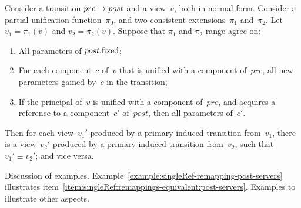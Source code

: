 \begin{lemma}
\label{lem:singleRef:remappings-equivalent}
Consider a transition $pre \stackrel{}\rightarrow post$ and a view~$v$, both in normal form.
Consider a partial unification function~$\pi_0$, and two consistent
extensions~$\pi_1$ and~$\pi_2$.  Let $v_1 = \pi_1(v)$ and $v_2 = \pi_2(v)$.
Suppose that $\pi_1$ and $\pi_2$ range-agree on:
%
\begin{enumerate}
\item\label{item:singleRef:remappings-equivalent:post-servers} All parameters
  of $post.\mathrm{fixed}$;

\item For each component~$c$ of~$v$ that is unified with a component of~$pre$,
  all new parameters gained by~$c$ in the transition;

\item If the principal of~$v$ is unified with a component of~$pre$, and
  acquires a reference to a component~$c'$ of~$post$, then all parameters
  of~$c'$. 
\end{enumerate}
%
Then for each view~$v_1'$ produced by a primary induced transition from~$v_1$,
there is a view~$v_2'$ produced by a primary induced transition from~$v_2$,
such that $v_1' \equiv v_2'$; and vice versa.
\end{lemma}


\framebox{**} Discussion of examples.
Example~\ref{example:singleRef-remapping-post-servers} illustrates
item~\ref{item:singleRef:remappings-equivalent:post-servers}.  Examples to
illustrate other aspects. 


